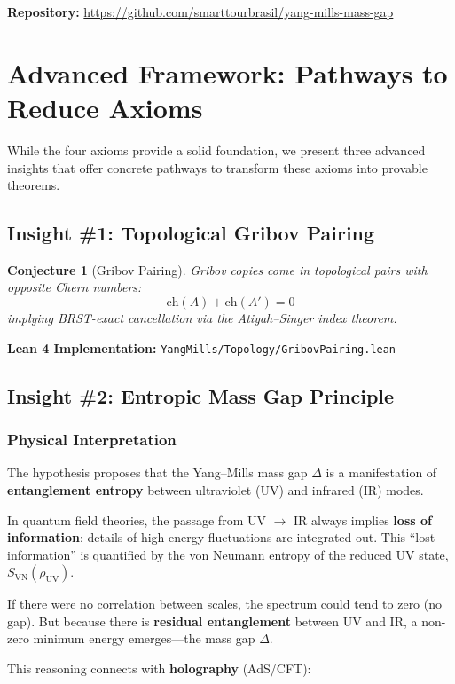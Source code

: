 \documentclass[11pt]{article}
\newtheorem{conjecture}[theorem]{Conjecture}
\theoremstyle{definition}
\theoremstyle{remark}
\begin{document}
\textbf{Repository:} \url{https://github.com/smarttourbrasil/yang-mills-mass-gap}

\section{Advanced Framework: Pathways to Reduce Axioms}

While the four axioms provide a solid foundation, we present three advanced insights that offer concrete pathways to transform these axioms into provable theorems.

\subsection{Insight \#1: Topological Gribov Pairing}

\begin{conjecture}[Gribov Pairing]
Gribov copies come in topological pairs with opposite Chern numbers:
\[
\text{ch}(A) + \text{ch}(A') = 0
\]
implying BRST-exact cancellation via the Atiyah--Singer index theorem.
\end{conjecture}

\textbf{Lean 4 Implementation:} \texttt{YangMills/Topology/GribovPairing.lean}

\subsection{Insight \#2: Entropic Mass Gap Principle}

\subsubsection{Physical Interpretation}

The hypothesis proposes that the Yang--Mills mass gap $\Delta$ is a manifestation of \textbf{entanglement entropy} between ultraviolet (UV) and infrared (IR) modes.

In quantum field theories, the passage from UV $\to$ IR always implies \textbf{loss of information}: details of high-energy fluctuations are integrated out. This ``lost information'' is quantified by the von Neumann entropy of the reduced UV state, $S_{\text{VN}}(\rho_{\text{UV}})$.

If there were no correlation between scales, the spectrum could tend to zero (no gap). But because there is \textbf{residual entanglement} between UV and IR, a non-zero minimum energy emerges---the mass gap $\Delta$.

This reasoning connects with \textbf{holography} (AdS/CFT):
\end{document}
